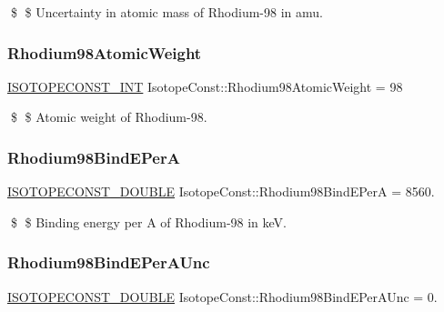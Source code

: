 \$ \$ Uncertainty in atomic mass of Rhodium-\/98 in amu. \mbox{\label{group___isotope_const-_rhodium-_rh98_gade04325f1ad8901ffa75c91a31a6e0b5}} 
\subsubsection{\texorpdfstring{Rhodium98\+Atomic\+Weight}{Rhodium98AtomicWeight}}
{\footnotesize\ttfamily \mbox{\hyperlink{group___isotope_const-_macros_ga5f18360b3e99483a35c32d789e62621c}{I\+S\+O\+T\+O\+P\+E\+C\+O\+N\+S\+T\+\_\+\+I\+NT}} Isotope\+Const\+::\+Rhodium98\+Atomic\+Weight = 98}

\$ \$ Atomic weight of Rhodium-\/98. \mbox{\label{group___isotope_const-_rhodium-_rh98_ga534c607bac7b63764cd60d481086a7cf}} 
\subsubsection{\texorpdfstring{Rhodium98\+Bind\+E\+PerA}{Rhodium98BindEPerA}}
{\footnotesize\ttfamily \mbox{\hyperlink{group___isotope_const-_macros_ga8f45a7272ce02c0b4c65c44636ed719a}{I\+S\+O\+T\+O\+P\+E\+C\+O\+N\+S\+T\+\_\+\+D\+O\+U\+B\+LE}} Isotope\+Const\+::\+Rhodium98\+Bind\+E\+PerA = 8560.}

\$ \$ Binding energy per A of Rhodium-\/98 in keV. \mbox{\label{group___isotope_const-_rhodium-_rh98_ga95cf6185fb292e1506cab5ac9de06acc}} 
\subsubsection{\texorpdfstring{Rhodium98\+Bind\+E\+Per\+A\+Unc}{Rhodium98BindEPerAUnc}}
{\footnotesize\ttfamily \mbox{\hyperlink{group___isotope_const-_macros_ga8f45a7272ce02c0b4c65c44636ed719a}{I\+S\+O\+T\+O\+P\+E\+C\+O\+N\+S\+T\+\_\+\+D\+O\+U\+B\+LE}} Isotope\+Const\+::\+Rhodium98\+Bind\+E\+Per\+A\+Unc = 0.}

